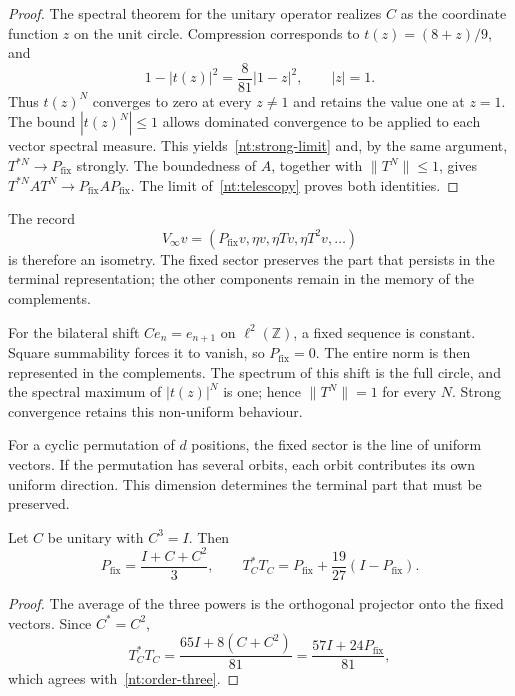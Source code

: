 \begin{proof}
The spectral theorem for the unitary operator realizes \(C\) as
the coordinate function \(z\) on the unit circle.
Compression corresponds to \(t(z)=(8+z)/9\), and
\begin{equation}
 1-|t(z)|^2=\frac8{81}|1-z|^2,
 \qquad |z|=1.
 \label{nt:circular-defect}
\end{equation}
Thus \(t(z)^N\) converges to zero at every \(z\ne1\) and retains
the value one at \(z=1\). The bound \(|t(z)^N|\leq1\) allows
dominated convergence to be applied to each vector spectral measure.
This yields~\eqref{nt:strong-limit} and, by the same argument,
\(T^{*N}\to P_{\mathrm{fix}}\) strongly. The boundedness of
\(A\), together with \(\|T^N\|\leq1\), gives
\(T^{*N}AT^N\to P_{\mathrm{fix}}AP_{\mathrm{fix}}\).
The limit of~\eqref{nt:telescopy} proves both identities.
\end{proof}

The record
\[
 V_\infty v=(P_{\mathrm{fix}}v,\eta v,\eta Tv,\eta T^2v,\ldots)
\]
is therefore an isometry. The fixed sector preserves the
part that persists in the terminal representation; the other
components remain in the memory of the complements.

For the bilateral shift
\(C e_n=e_{n+1}\) on \(\ell^2(\mathbb Z)\), a fixed sequence
is constant. Square summability forces it to
vanish, so \(P_{\mathrm{fix}}=0\). The entire norm
is then represented in the complements. The spectrum of
this shift is the full circle, and the spectral
maximum of \(|t(z)|^N\) is one; hence
\(\|T^N\|=1\) for every \(N\). Strong convergence retains
this non-uniform behaviour.

For a cyclic permutation of \(d\) positions, the fixed sector
is the line of uniform vectors. If the permutation has
several orbits, each orbit contributes its own uniform direction.
This dimension determines the terminal part that must be preserved.

\begin{proposition}
Let \(C\) be unitary with \(C^3=I\). Then
\begin{equation}
 P_{\mathrm{fix}}=\frac{I+C+C^2}{3},
 \qquad
 T_C^*T_C=P_{\mathrm{fix}}+
 \frac{19}{27}(I-P_{\mathrm{fix}}).
 \label{nt:order-three}
\end{equation}
\end{proposition}

\begin{proof}
The average of the three powers is the orthogonal projector
onto the fixed vectors. Since \(C^*=C^2\),
\[
 T_C^*T_C=\frac{65I+8(C+C^2)}{81}
 =\frac{57I+24P_{\mathrm{fix}}}{81},
\]
which agrees with~\eqref{nt:order-three}.
\end{proof}

